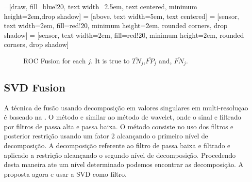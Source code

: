 \documentclass[conference]{IEEEtran}
\begin{document}
=[draw, fill=blue!20, text width=2.5em, 
    text centered, minimum height=2em,drop shadow]
 = [above, text width=5em, text centered]
 = [sensor, text width=2em, fill=red!20, 
    minimum height=2em, rounded corners, drop shadow]
 = [sensor, text width=2em, fill=red!20, 
    minimum height=2em, rounded corners, drop shadow]
\begin{figure}[hbt]
\caption{ROC Fusion for each $j$. It is true to $\overline{TN}_j$,$\overline{FP}_j$ and, $\overline{FN}_j$. }
\label{fig9}
\end{figure}

\subsection{SVD Fusion} 
A técnica de fusão usando decomposição em valores singulares em multi-resoluçao é baseado na \cite{naidu}. O método e similar ao método de wavelet, onde o sinal e filtrado por filtros de passa alta e passa baixa. O método consiste  no uso dos filtros e posterior restrição usando um fator 2 alcançando o primeiro nível de decomposição. A decomposição referente ao filtro de passa baixa e filtrado e aplicado a restrição alcançando o segundo nível de decomposição. Procedendo desta maneira ate um nível determinado podemos encontrar as decomposição. A proposta agora e usar a SVD como filtro. 
\end{document}
